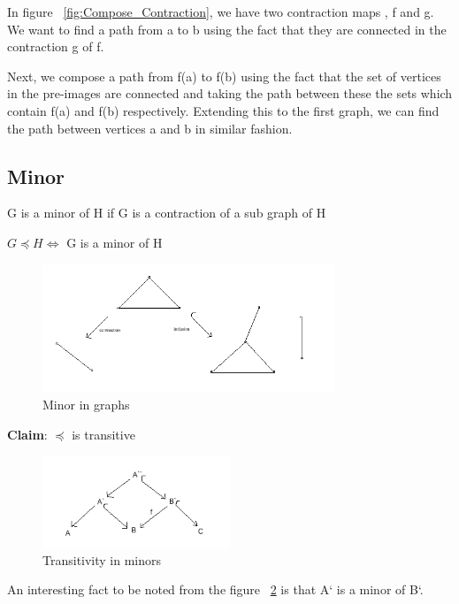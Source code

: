 \documentclass{article}
\newcounter{lecnum}
\newcommand{\fig}[4]{
			\begin{center}
	                \texttt{[image: \#3]} \\
			Figure \thelecnum.#1:~#2
			\end{center}
	}
\begin{document}
In figure ~\ref{fig:Compose_Contraction}, we have two contraction maps , f and g. We want to find a path from a to b using the fact that they are connected in the contraction g of f.

Next, we compose a path from f(a) to f(b) using the fact that the set of vertices in the pre-images are connected and taking the path between
these the sets which contain f(a) and f(b) respectively. Extending this to the first graph, we can find the path between vertices a and b in similar fashion.


\subsection{\textbf{Minor}}
G is a minor of H if G is a contraction of a sub graph of H

$G \preceq H \iff$ G is a minor of H 

\begin{figure}[!h]
    \centering
    \includegraphics[width=0.78\textwidth]{images/Fig_(last-1).png}
    \caption{Minor in graphs}
    \label{fig:}
\end{figure}

\textbf{Claim}: $\preceq$ is transitive

\begin{figure}[!h]
    \centering
    \includegraphics[width=0.5\textwidth]{images/Fig_last.png}
    \caption{Transitivity in minors}
    \label{fig:Fig_last}
\end{figure}

An interesting fact to be noted from the figure ~\ref{fig:Fig_last} is that A` is a minor of B`.
\end{document}
